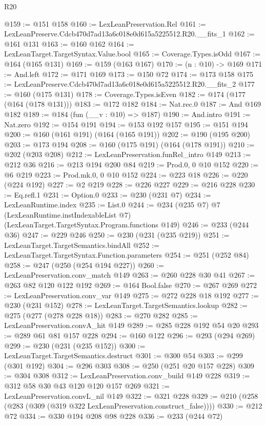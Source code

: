 \begin{lexlean}{R20}
\begin{coremodule}
@159 := @151 @158
@160 := LexLeanPreservation.Rel
@161 := LexLeanPreserve.Cdcb470d7ad13a6c018e0d615a5225512.R20.__fits_1
@162 := @161 @131
@163 := @160 @162
@164 := LexLeanTarget.TargetSyntax.Value.bool
@165 := Coverage.Types.isOdd
@167 := @164 (@165 @131)
@169 := @159 (@163 @167)
@170 := (n : @10) -> @169
@171 := And.left
@172 := @171 @169
@173 := @150 @72
@174 := @173 @158
@175 := LexLeanPreserve.Cdcb470d7ad13a6c018e0d615a5225512.R20.__fits_2
@177 := @160 (@175 @131)
@178 := Coverage.Types.isEven
@182 := @174 (@177 (@164 (@178 @131)))
@183 := @172 @182
@184 := Nat.rec.{0}
@187 := And @169 @182
@189 := @184 (fun (__v : @10) => @187)
@190 := And.intro
@191 := Nat.zero
@192 := @154 @191
@194 := @153 @192 @157
@195 := @151 @194
@200 := @160 (@161 @191) (@164 (@165 @191))
@202 := @190 (@195 @200)
@203 := @173 @194
@208 := @160 (@175 @191) (@164 (@178 @191))
@210 := @202 (@203 @208)
@212 := LexLeanPreservation.funRel_intro @149
@213 := @212 @36
@216 := @213 @194 @200 @84
@219 := Prod.{0, 0} @10 @152
@220 := @6 @219
@223 := Prod.mk.{0, 0} @10 @152
@224 := @223 @18
@226 := @220 (@224 @192)
@227 := @2 @219
@228 := @226 @227
@229 := @216 @228
@230 := Eq.refl.{1}
@231 := Option.{0}
@233 := @230 (@231 @7)
@234 := LexLeanRuntime.index
@235 := List.{0}
@244 := @234
    (@235 @7)
    @7
    (LexLeanRuntime.instIndexableList @7)
    (LexLeanTarget.TargetSyntax.Program.functions @149)
@246 := @233 (@244 @36)
@247 := @229 @246
@250 := @230 (@231 (@235 @219))
@251 := LexLeanTarget.TargetSemantics.bindAll
@252 := LexLeanTarget.TargetSyntax.Function.parameters
@254 := @251 (@252 @84)
@258 := @247 (@250 (@254 @194 @227))
@260 := LexLeanPreservation.conv_match @149
@263 := @260 @228 @30 @41
@267 := @263 @82 @120 @122 @192
@269 := @164 Bool.false
@270 := @267 @269
@272 := LexLeanPreservation.conv_var @149
@275 := @272 @228 @18 @192
@277 := @230 (@231 @152)
@278 := LexLeanTarget.TargetSemantics.lookup
@282 := @275 (@277 (@278 @228 @18))
@283 := @270 @282
@285 := LexLeanPreservation.convA_hit @149
@289 := @285 @228 @192 @54 @20
@293 := @289 @61 @81 @157 @228
@294 := @160 @122
@296 := @293 (@294 @269)
@299 := @230 (@231 (@235 @152))
@300 := LexLeanTarget.TargetSemantics.destruct
@301 := @300 @54
@303 := @299 (@301 @192)
@304 := @296 @303
@308 := @250 (@251 @20 @157 @228)
@309 := @304 @308
@312 := LexLeanPreservation.conv_build @149 @228
@319 := @312 @58 @30 @43 @120 @120 @157 @269
@321 := LexLeanPreservation.convL_nil @149
@322 := @321 @228
@329 := @210 (@258 (@283 (@309 (@319 @322 LexLeanPreservation.construct_false))))
@330 := @212 @72
@334 := @330 @194 @208 @98 @228
@336 := @233 (@244 @72)

\end{coremodule}
\end{lexlean}
